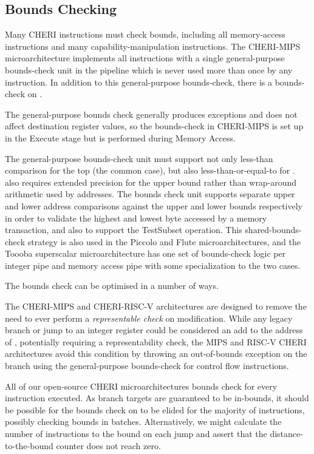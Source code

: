 \subsection{Bounds Checking}
Many CHERI instructions must check bounds, including all memory-access instructions and many capability-manipulation instructions.
The CHERI-MIPS microarchitecture implements all instructions with a single general-purpose bounds-check unit in the pipeline which is never used more than once by any instruction.
In addition to this general-purpose bounds-check, there is a bounds-check on \PCC{}.

The general-purpose bounds check generally produces exceptions and does not affect destination register values, so the bounds-check in CHERI-MIPS is set up in the Execute stage but is performed during Memory Access.

The general-purpose bounds-check unit must support not only less-than comparison for the top (the common case), but also less-than-or-equal-to for .
 also requires extended precision for the upper bound rather than wrap-around arithmetic used by addresses.
The bounds check unit supports separate upper and lower address comparisons against the upper and lower bounds respectively in order to validate the highest and lowest byte accessed by a memory transaction, and also to support the TestSubset operation.
This shared-bounds-check strategy is also used in the Piccolo and Flute microarchitectures, and the Toooba superscalar microarchitecture has one set of bounds-check logic per integer pipe and memory access pipe with some specialization to the two cases.

The \PCC{} bounds check can be optimised in a number of ways.

The CHERI-MIPS and CHERI-RISC-V architectures are designed to remove the need to ever perform a \emph{representable check} on \PCC{} modification.
While any legacy branch or jump to an integer register could be considered an add to the address of \PCC{}, potentially requiring a representability check, the MIPS and RISC-V CHERI architectures avoid this condition by throwing an out-of-bounds exception on the branch using the general-purpose bounds-check for control flow instructions.

All of our open-source CHERI microarchitectures bounds check \PCC{} for every instruction executed.
As branch targets are guaranteed to be in-bounds, it should be possible for the bounds check on \PCC{} to be elided for the majority of instructions, possibly checking \PCC{} bounds in batches.
Alternatively, we might calculate the number of instructions to the bound on each jump and assert that the distance-to-the-bound counter does not reach zero.

